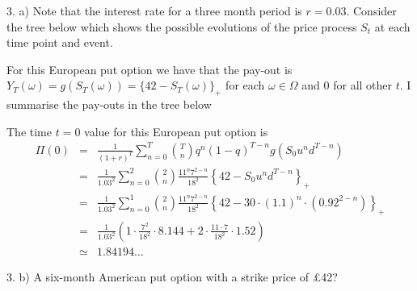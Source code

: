 \documentclass[11pt,a4paper]{article}
\begin{document}
\begin{answer}{3. a)}
  Note that the interest rate for a three month period is $r=0.03$.
  Consider the tree below which shows the possible evolutions of the price process $S_t$ at each time point and event.
  \begin{center}
  \end{center}
  For this European put option we have that the pay-out is $Y_T(\omega)=g(S_T(\omega))=\{42-S_T(\omega)\}_+$ for each $\omega\in\Omega$ and $0$ for all other $t$. I summarise the pay-outs in the tree below
  \begin{center}
  \end{center}
  The time $t=0$ value for this European put option is
  \[\begin{array}{rcl}
    \Pi(0)&=&\frac1{(1+r)^T}\sum_{n=0}^T{T\choose n}q^n(1-q)^{T-n}g(S_0u^nd^{T-n})\\
    &=&\frac1{1.03^2}\sum_{n=0}^2{2\choose n}\frac{11^n7^{2-n}}{18^2}\left\{42-S_0u^nd^{T-n}\right\}_+\\
    &=&\frac1{1.03^2}\sum_{n=0}^1{2\choose n}\frac{11^n7^{2-n}}{18^2}\left\{42-30\cdot(1.1)^n\cdot(0.92^{2-n})\right\}_+\\
    &=&\frac1{1.03^2}\left(1\cdot\frac{7^2}{18^2}\cdot8.144+2\cdot\frac{11\cdot7}{18^2}\cdot1.52\right)\\
    &\simeq&1.84194\dots
  \end{array}\]
\end{answer}

\begin{question}{3. b)}
  A six-month American put option with a strike price of £42?
\end{question}
\end{document}
